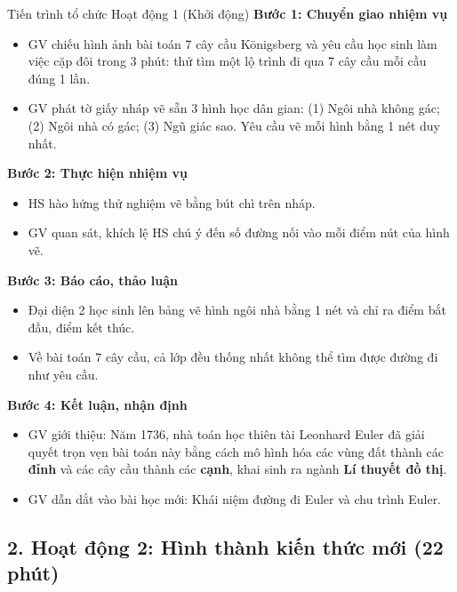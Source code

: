 \documentclass[12pt, a4paper]{article}
\begin{document}
\begin{pedabox}{Tiến trình tổ chức Hoạt động 1 (Khởi động)}
    \textbf{Bước 1: Chuyển giao nhiệm vụ}
    \begin{itemize}[leftmargin=0.6cm]
        \item GV chiếu hình ảnh bài toán 7 cây cầu Königsberg và yêu cầu học sinh làm việc cặp đôi trong 3 phút: thử tìm một lộ trình đi qua 7 cây cầu mỗi cầu đúng 1 lần.
        \item GV phát tờ giấy nháp vẽ sẵn 3 hình học dân gian: (1) Ngôi nhà không gác; (2) Ngôi nhà có gác; (3) Ngũ giác sao. Yêu cầu vẽ mỗi hình bằng 1 nét duy nhất.
    \end{itemize}

    \textbf{Bước 2: Thực hiện nhiệm vụ}
    \begin{itemize}[leftmargin=0.6cm]
        \item HS hào hứng thử nghiệm vẽ bằng bút chì trên nháp.
        \item GV quan sát, khích lệ HS chú ý đến số đường nối vào mỗi điểm nút của hình vẽ.
    \end{itemize}

    \textbf{Bước 3: Báo cáo, thảo luận}
    \begin{itemize}[leftmargin=0.6cm]
        \item Đại diện 2 học sinh lên bảng vẽ hình ngôi nhà bằng 1 nét và chỉ ra điểm bắt đầu, điểm kết thúc.
        \item Về bài toán 7 cây cầu, cả lớp đều thống nhất không thể tìm được đường đi như yêu cầu.
    \end{itemize}

    \textbf{Bước 4: Kết luận, nhận định}
    \begin{itemize}[leftmargin=0.6cm]
        \item GV giới thiệu: Năm 1736, nhà toán học thiên tài Leonhard Euler đã giải quyết trọn vẹn bài toán này bằng cách mô hình hóa các vùng đất thành các \textbf{đỉnh} và các cây cầu thành các \textbf{cạnh}, khai sinh ra ngành \textbf{Lí thuyết đồ thị}.
        \item GV dẫn dắt vào bài học mới: Khái niệm đường đi Euler và chu trình Euler.
    \end{itemize}
\end{pedabox}

\subsection*{2. Hoạt động 2: Hình thành kiến thức mới (22 phút)}
\end{document}
